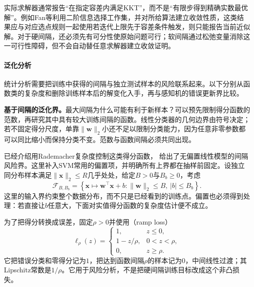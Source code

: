实际求解器通常报告“在指定容差内满足KKT”，而不是“有限步得到精确实数最优解”。例如Fan等利用二阶信息选择工作集，并对所给算法建立收敛性质，这类结果应与对应选点规则一起使用若迭代上限先于容差条件触发，则只能报告当前近似解。对于硬间隔，还必须先有可分性使原始问题可行；软间隔通过松弛变量消除这一可行性障碍，但不会自动替任意求解器建立收敛证明。

\paragraph{泛化分析}
\label{sec:classification-svm-generalization}

统计分析需要把训练中获得的间隔与独立测试样本的风险联系起来。以下分别从函数类的复杂度和删除训练样本后的解变化入手，再与感知机的错误更新界比较。

\label{sec:classification-svm-margin-generalization}

\textbf{基于间隔的泛化界。}最大间隔为什么可能有利于新样本？可以预先限制得分函数的范数，再研究其中具有较大训练间隔的函数。线性分类器的几何边界由符号决定；若不固定得分尺度，单靠$\lVert\bm{w}\rVert_2$小还不足以限制分类能力，因为任意非零参数都可以同比缩小而保持分类不变。范数与函数间隔必须共同出现。

已经介绍用Rademacher复杂度控制这类得分函数，
给出了无偏置线性模型的间隔风险界。这里补入SVM常用的偏置项，并明确所有上界都在抽样前固定。设独立同分布样本满足$\lVert\bm{x}\rVert_2\le R$几乎处处，给定$B>0$与$B_b\ge0$，考虑
\[
  \mathcal{F}_{B,B_b}
  =\left\{
    \bm{x}\mapsto\bm{w}^{\top}\bm{x}+b:
    \lVert\bm{w}\rVert_2\le B,\ |b|\le B_b
   \right\}.
\]
这里的输入界约束整个数据分布，而不只是已经看到的训练点。偏置也必须得到处理：若直接让$b$任意大，下面对实值得分函数的复杂度估计便不成立。

为了把得分转换成误差，固定$\rho>0$并使用（ramp loss）
\begin{equation}
  \ell_\rho(z)=
  \begin{cases}
    1, & z\le0,\\
    1-z/\rho, & 0<z<\rho,\\
    0, & z\ge\rho.
  \end{cases}
  \label{eq:classification-svm-ramp}
\end{equation}
它把错误分类和零得分记为$1$，把达到函数间隔$\rho$的样本记为$0$，中间线性过渡；其Lipschitz常数是$1/\rho$。它用于风险分析，不是把硬间隔训练目标改成这个非凸损失。

